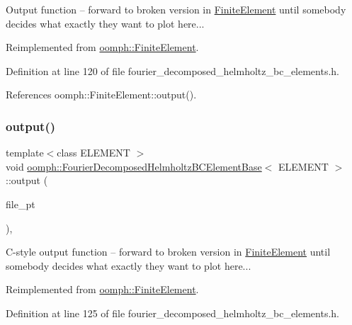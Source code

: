Output function -- forward to broken version in \hyperlink{classoomph_1_1FiniteElement}{Finite\+Element} until somebody decides what exactly they want to plot here... 



Reimplemented from \hyperlink{classoomph_1_1FiniteElement_afa9d9b2670f999b43e6679c9dd28c457}{oomph\+::\+Finite\+Element}.



Definition at line 120 of file fourier\+\_\+decomposed\+\_\+helmholtz\+\_\+bc\+\_\+elements.\+h.



References oomph\+::\+Finite\+Element\+::output().

\mbox{\label{classoomph_1_1FourierDecomposedHelmholtzBCElementBase_a06238e8fd09c6daf38d5cea2c7f38404}} 
\subsubsection{\texorpdfstring{output()}{output()}\hspace{0.1cm}{\footnotesize\ttfamily [3/4]}}
{\footnotesize\ttfamily template$<$class E\+L\+E\+M\+E\+NT $>$ \\
void \hyperlink{classoomph_1_1FourierDecomposedHelmholtzBCElementBase}{oomph\+::\+Fourier\+Decomposed\+Helmholtz\+B\+C\+Element\+Base}$<$ E\+L\+E\+M\+E\+NT $>$\+::output (\begin{DoxyParamCaption}\item[{F\+I\+LE $\ast$}]{file\+\_\+pt }\end{DoxyParamCaption})\hspace{0.3cm}{\ttfamily [inline]}, {\ttfamily [virtual]}}

C-\/style output function -- forward to broken version in \hyperlink{classoomph_1_1FiniteElement}{Finite\+Element} until somebody decides what exactly they want to plot here... 

Reimplemented from \hyperlink{classoomph_1_1FiniteElement_a72cddd09f8ddbee1a20a1ff404c6943e}{oomph\+::\+Finite\+Element}.



Definition at line 125 of file fourier\+\_\+decomposed\+\_\+helmholtz\+\_\+bc\+\_\+elements.\+h.



